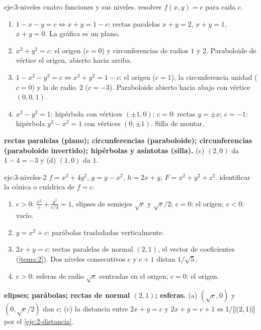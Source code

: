 \begin{solucion}{eje:3-niveles}
\datos cuatro funciones y sus niveles.
\planteamiento resolver $f(x,y)=c$ para cada $c$.
\pasos
\begin{enumerate}[label=(\alph*)]
  \item $1-x-y=c\iff x+y=1-c$: rectas paralelas $x+y=2$, $x+y=1$, $x+y=0$. La gráfica es un plano.
  \item $x^2+y^2=c$: el origen ($c=0$) y circunferencias de radios $1$ y $2$. Paraboloide de vértice el origen, abierto hacia arriba.
  \item $1-x^2-y^2=c\iff x^2+y^2=1-c$: el origen ($c=1$), la circunferencia unidad ($c=0$) y la de radio~$2$ ($c=-3$). Paraboloide abierto hacia abajo con vértice $(0,0,1)$.
  \item $x^2-y^2=1$: hipérbola con vértices $(\pm1,0)$; $c=0$: rectas $y=\pm x$; $c=-1$: hipérbola $y^2-x^2=1$ con vértices $(0,\pm1)$. Silla de montar.
\end{enumerate}
\resultado \textbf{rectas paralelas (plano); circunferencias (paraboloide); circunferencias (paraboloide invertido); hipérbolas y asíntotas (silla).}
\comprobacion (c) $(2,0)$ da $1-4=-3$ y (d) $(1,0)$ da $1$.
\end{solucion}

\begin{solucion}{eje:3-niveles-2}
\datos $f=x^2+4y^2$, $g=y-x^2$, $h=2x+y$, $F=x^2+y^2+z^2$.
\planteamiento identificar la cónica o cuádrica de $f=c$.
\pasos
\begin{enumerate}[label=(\alph*)]
  \item $c>0$: $\frac{x^2}{c}+\frac{y^2}{c/4}=1$, elipses de semiejes $\sqrt c$ y $\sqrt c/2$; $c=0$: el origen; $c<0$: vacío.
  \item $y=x^2+c$: parábolas trasladadas verticalmente.
  \item $2x+y=c$: rectas paralelas de normal $(2,1)$, el vector de coeficientes (\cref{tema:2}). Dos niveles consecutivos $c$ y $c+1$ distan $1/\sqrt5$.
  \item $c>0$: esferas de radio $\sqrt c$ centradas en el origen; $c=0$: el origen.
\end{enumerate}
\resultado \textbf{elipses; parábolas; rectas de normal $(2,1)$; esferas.}
\comprobacion (a) $(\sqrt c,0)$ y $(0,\sqrt c/2)$ dan $c$; (c) la distancia entre $2x+y=c$ y $2x+y=c+1$ es $1/\lVert(2,1)\rVert$ por el \cref{eje:2-distancia}.
\end{solucion}

